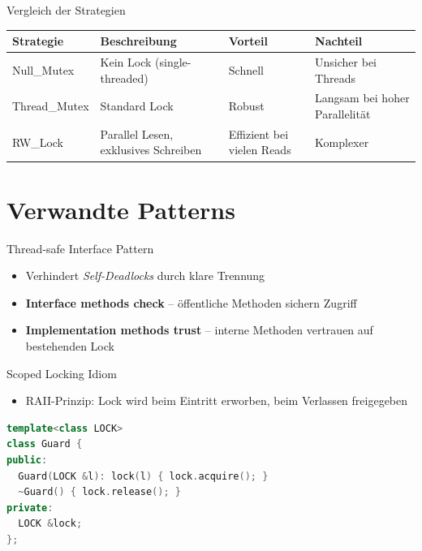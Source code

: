 \documentclass[aspectratio=169,10pt]{beamer}
\begin{document}
\begin{frame}{Vergleich der Strategien}
  \begin{tabular}{|l|l|l|l|}
  \hline
    \textbf{Strategie} & \textbf{Beschreibung} & \textbf{Vorteil} & \textbf{Nachteil} \\
  \hline
  Null\_Mutex & Kein Lock (single-threaded) & Schnell & Unsicher bei Threads \\
  Thread\_Mutex & Standard Lock & Robust & Langsam bei hoher Parallelität \\
  RW\_Lock & Parallel Lesen, exklusives Schreiben & Effizient bei vielen Reads & Komplexer \\
  \hline
  \end{tabular}
\end{frame}

\section{Verwandte Patterns}
\begin{frame}{Thread-safe Interface Pattern}
  \begin{itemize}
    \item Verhindert \textit{Self-Deadlocks} durch klare Trennung
    \item \textbf{Interface methods check} – öffentliche Methoden sichern Zugriff
    \item \textbf{Implementation methods trust} – interne Methoden vertrauen auf bestehenden Lock
  \end{itemize}
\end{frame}

\begin{frame}{Scoped Locking Idiom}
  \begin{itemize}
    \item RAII-Prinzip: Lock wird beim Eintritt erworben, beim Verlassen freigegeben
  \end{itemize}
  \vspace{1em}
  \begin{lstlisting}[language=C++]
template<class LOCK>
class Guard {
public:
  Guard(LOCK &l): lock(l) { lock.acquire(); }
  ~Guard() { lock.release(); }
private:
  LOCK &lock;
};
  \end{lstlisting}
\end{frame}

\end{document}
